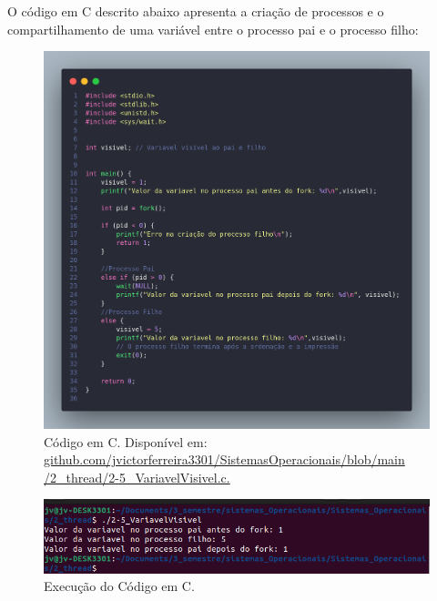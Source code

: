 \documentclass[
	12pt,				%
	openright,			%
	oneside,			%
	a4paper,			%
	chapter=TITLE,		%
	english,			%
	french,				%
	spanish,			%
	brazil				%
	]{abntex2}
\theoremstyle{definition}
\begin{document}
O código em C descrito abaixo apresenta a criação de processos e o compartilhamento de uma variável entre o processo pai e o processo filho:

\begin{figure}
    \centering
    \includegraphics[width=0.6 \textwidth]{imagens/processos_5.png}
    \caption{Código em C. Disponível em: \href{https://github.com/jvictorferreira3301/Sistemas_Operacionais/blob/main/2_thread/2-5_VariavelVisivel.c}{github.com/jvictorferreira3301/SistemasOperacionais/blob/main
    /2\_thread/2-5\_VariavelVisivel.c.}}
    \label{fig:proc5}
\end{figure}

\begin{figure}
    \centering
    \includegraphics[width=0.7 \textwidth]{imagens/run_processos_5.png}
    \caption{Execução do Código em C.}
    \label{fig:run5}
\end{figure}
\end{document}
